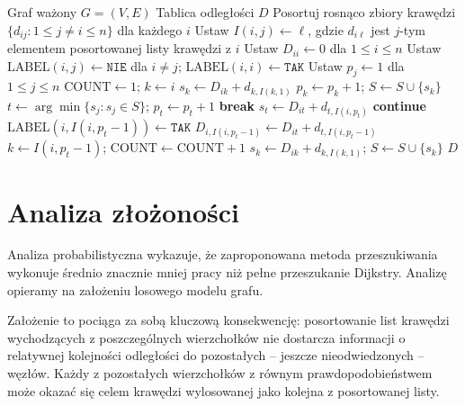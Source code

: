 \begin{algorithm}[H]
\caption{Algorytm Spiry -- APSP w grafie ważonym (dla jednego źródła)}
\begin{algorithmic}[1]
\Require Graf ważony $G = (V, E)$
\Ensure Tablica odległości $D$ 
\State Posortuj rosnąco zbiory krawędzi $\{d_{ij} : 1 \leq j \neq i \leq n\}$
       dla każdego $i$
\State Ustaw $I(i,j) \leftarrow \ell$, gdzie $d_{i\ell}$ jest $j$-tym elementem
       posortowanej listy krawędzi z $i$
\State Ustaw $D_{ii} \leftarrow 0$ dla $1 \leq i \leq n$
\State Ustaw $\mathrm{LABEL}(i,j) \leftarrow \texttt{NIE}$ dla $i \neq j$;
       $\mathrm{LABEL}(i,i) \leftarrow \texttt{TAK}$
  \State Ustaw $p_j \leftarrow 1$ dla $1 \leq j \leq n$
  \State $\mathrm{COUNT} \leftarrow 1$;
  $k \leftarrow i$
  \State $s_k \leftarrow D_{ik} + d_{k,I(k,1)}$
  \State $p_k \leftarrow p_k + 1$;
  $S \leftarrow S \cup \{s_k\}$
  \Repeat
    \State $t \leftarrow \arg\min\{s_j : s_j \in S\}$; $p_t \leftarrow p_t + 1$
     \textbf{break} \EndIf
    \State $s_t \leftarrow D_{it} + d_{t,I(i,p_t)}$
      \textbf{continue}
    \EndIf
    \State $\mathrm{LABEL}(i, I(i, p_t-1)) \leftarrow \texttt{TAK}$
    \State $D_{i,I(i,p_t-1)} \leftarrow D_{it} + d_{t,I(i,p_t-1)}$
    \State $k \leftarrow I(i, p_t - 1)$;
           $\mathrm{COUNT} \leftarrow \mathrm{COUNT} + 1$
    \State $s_k \leftarrow D_{ik} + d_{k,I(k,1)}$; $S \leftarrow S \cup \{s_k\}$
\EndFor
\State \Return $D$
\end{algorithmic}
\end{algorithm}

\section{Analiza złożoności}

Analiza probabilistyczna wykazuje, że zaproponowana metoda przeszukiwania wykonuje średnio znacznie mniej pracy niż pełne przeszukanie Dijkstry. Analizę opieramy na założeniu losowego modelu grafu.

Założenie to pociąga za sobą kluczową konsekwencję: posortowanie list krawędzi wychodzących z poszczególnych wierzchołków nie dostarcza informacji o relatywnej kolejności odległości do pozostałych -- jeszcze nieodwiedzonych -- węzłów. Każdy z pozostałych wierzchołków z równym prawdopodobieństwem może okazać się celem krawędzi wylosowanej jako kolejna z posortowanej listy.

